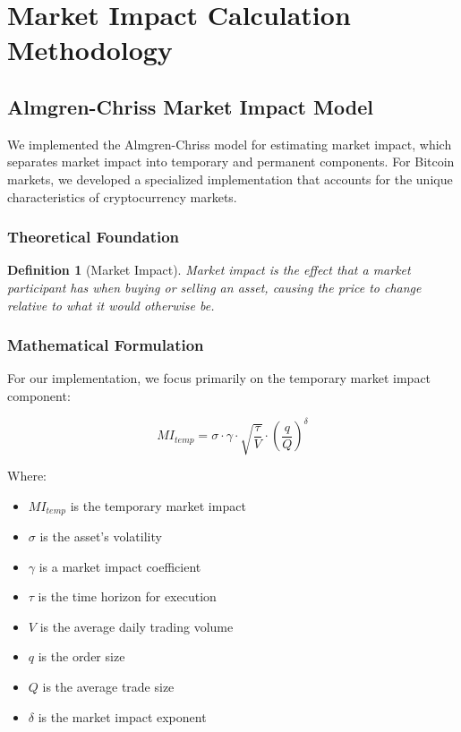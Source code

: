 \documentclass[10pt,twocolumn,a4paper]{IEEEtran}
\newtheorem{definition}{Definition}
\begin{document}
\section{Market Impact Calculation Methodology}

\subsection{Almgren-Chriss Market Impact Model}

We implemented the Almgren-Chriss model for estimating market impact, which separates market impact into temporary and permanent components. For Bitcoin markets, we developed a specialized implementation that accounts for the unique characteristics of cryptocurrency markets.

\subsubsection{Theoretical Foundation}

\begin{definition}[Market Impact]
Market impact is the effect that a market participant has when buying or selling an asset, causing the price to change relative to what it would otherwise be.
\end{definition}

\subsubsection{Mathematical Formulation}
For our implementation, we focus primarily on the temporary market impact component:

\begin{equation}
MI_{temp} = \sigma \cdot \gamma \cdot \sqrt{\frac{\tau}{V}} \cdot \left(\frac{q}{Q}\right)^\delta
\end{equation}

Where:
\begin{itemize}
    \item $MI_{temp}$ is the temporary market impact
    \item $\sigma$ is the asset's volatility
    \item $\gamma$ is a market impact coefficient
    \item $\tau$ is the time horizon for execution
    \item $V$ is the average daily trading volume
    \item $q$ is the order size
    \item $Q$ is the average trade size
    \item $\delta$ is the market impact exponent
\end{itemize}
\end{document}
